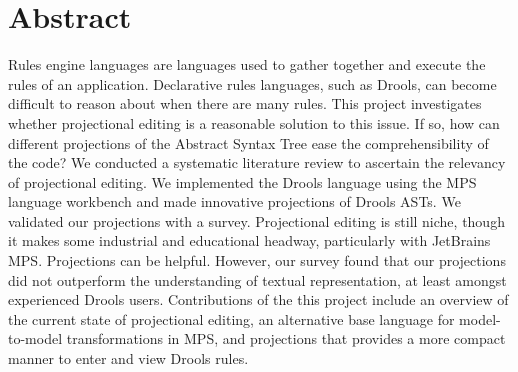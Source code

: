 \chapter*{Abstract}

Rules engine languages are languages used to gather together and execute the rules of an application.
Declarative rules languages, such as Drools, can become difficult to reason about when there are many rules.
This project investigates whether projectional editing is a reasonable solution to this issue.
If so, how can different projections of the Abstract Syntax Tree ease the comprehensibility of the code?
We conducted a systematic literature review to ascertain the relevancy of projectional editing.
We implemented the Drools language using the MPS language workbench and made innovative projections of Drools ASTs.
We validated our projections with a survey. 
Projectional editing is still niche, though it makes some industrial and educational headway, particularly with JetBrains MPS. 
Projections can be helpful. 
However, our survey found that our projections did not outperform the understanding of textual representation, at least amongst experienced Drools users. 
Contributions of the this project include an overview of the current state of projectional editing, an alternative base language for model-to-model transformations in MPS, and projections that provides a more compact manner to enter and view Drools rules. 
